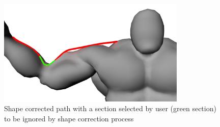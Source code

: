 \begin{figure}[H]
	\centering
	\includegraphics[width=0.8\textwidth]{../images/geodesic_image/bentArm_corrected}
	\caption{Shape corrected path with a section selected by user (green section) to be ignored by shape correction process}
	\label{figure:bentArm_corrected}
\end{figure}

